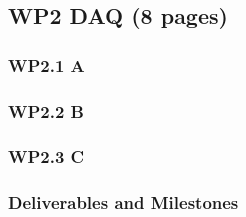 \subsection{WP2 DAQ (8 pages)}
\subsubsection{WP2.1 A}
\subsubsection{WP2.2 B}
\subsubsection{WP2.3 C}

\subsubsection{Deliverables and Milestones}

